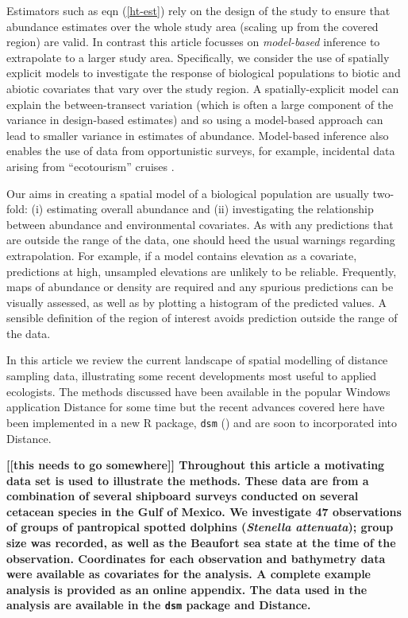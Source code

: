 \documentclass[a4paper,12pt]{article}
\begin{document}
Estimators such as eqn (\ref{ht-est}) rely on the design of the study to ensure that abundance estimates over the whole study area (scaling up from the covered region) are valid. In contrast this article focusses on \textit{model-based} inference to extrapolate to a larger study area. Specifically, we consider the use of spatially explicit models to investigate the response of biological populations to biotic and abiotic covariates that vary over the study region. A spatially-explicit model can explain the between-transect variation (which is often a large component of the variance in design-based estimates) and so using a model-based approach can lead to smaller variance in estimates of abundance. Model-based inference also enables the use of data from opportunistic surveys, for example, incidental data arising from ``ecotourism'' cruises \citep{Williams:2006tz}. 

Our aims in creating a spatial model of a biological population are usually two-fold: (i) estimating overall abundance and (ii) investigating the relationship between abundance and environmental covariates. As with any predictions that are outside the range of the data, one should heed the usual warnings regarding extrapolation. For example, if a model contains elevation as a covariate, predictions at high, unsampled elevations are unlikely to be reliable. Frequently, maps of abundance or density are required and any spurious predictions can be visually assessed, as well as by plotting a histogram of the predicted values. A sensible definition of the region of interest avoids prediction outside the range of the data.

In this article we review the current landscape of spatial modelling of distance sampling data, illustrating some recent developments most useful to applied ecologists. The methods discussed have been available in the popular Windows application Distance \citep{Thomas:2010cf} for some time but the recent advances covered here have been implemented in a new \textsf{R} package, \texttt{dsm} (\cite{Miller:2013to})  and are soon to incorporated into Distance.

\textbf{[[this needs to go somewhere]] Throughout this article a motivating data set is used to illustrate the methods. These data are from a combination of several shipboard surveys conducted on several cetacean species in the Gulf of Mexico. We investigate 47 observations of groups of pantropical spotted dolphins (\textit{Stenella attenuata}); group size was recorded, as well as the Beaufort sea state at the time of the observation. Coordinates for each observation and bathymetry data were available as covariates for the analysis. A complete example analysis is provided as an online appendix. The data used in the analysis are available in the \texttt{dsm} package and Distance.}
\end{document}
